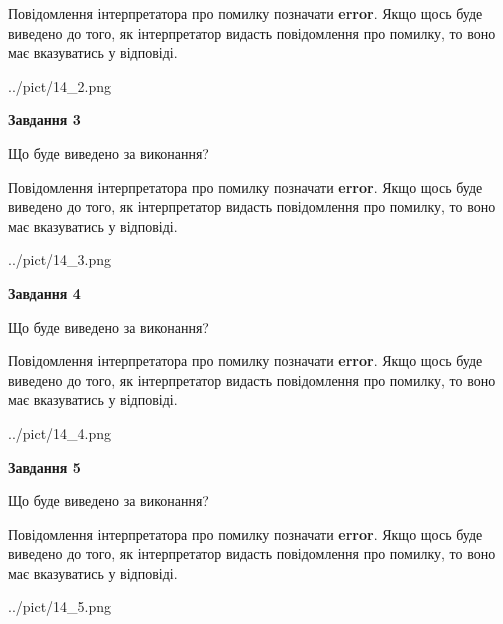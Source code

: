 \documentclass[12pt, ukrainian]{article}
\begin{document}
{\begin {large}
Повідомлення інтерпретатора про помилку позначати \textbf{error}.
Якщо щось буде виведено до того, як інтерпретатор видасть повідомлення про помилку, 
то воно має вказуватись у відповіді. \par


\begin{center}
	{../pict/14_2.png}
\end{center}
\newpage

{\begin {center}\textbf{Завдання 3}\end {center}}\par
Що буде виведено за виконання?

Повідомлення інтерпретатора про помилку позначати \textbf{error}.
Якщо щось буде виведено до того, як інтерпретатор видасть повідомлення про помилку, 
то воно має вказуватись у відповіді. \par


\begin{center}
	{../pict/14_3.png}
\end{center}
\newpage

{\begin {center}\textbf{Завдання 4}\end {center}}\par
Що буде виведено за виконання?

Повідомлення інтерпретатора про помилку позначати \textbf{error}.
Якщо щось буде виведено до того, як інтерпретатор видасть повідомлення про помилку, 
то воно має вказуватись у відповіді. \par


\begin{center}
	{../pict/14_4.png}
\end{center}
\newpage

{\begin {center}\textbf{Завдання 5}\end {center}}\par
Що буде виведено за виконання?

Повідомлення інтерпретатора про помилку позначати \textbf{error}.
Якщо щось буде виведено до того, як інтерпретатор видасть повідомлення про помилку, 
то воно має вказуватись у відповіді. \par


\begin{center}
	{../pict/14_5.png}
\end{center}
\newpage


\end{large}}
\end{document}
